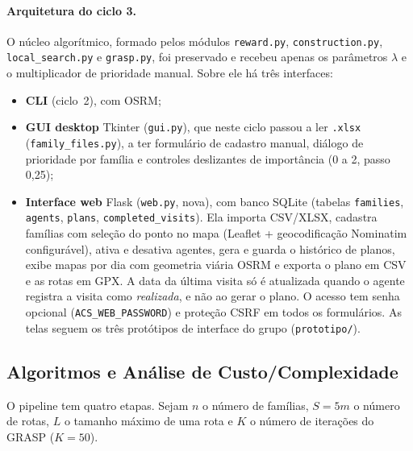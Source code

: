 \documentclass[11pt,a4paper]{article}
\begin{document}
\paragraph{Arquitetura do ciclo 3.} O núcleo algorítmico, formado pelos módulos \texttt{reward.py}, \texttt{construction.py}, \texttt{local\_search.py} e \texttt{grasp.py}, foi preservado e recebeu apenas os parâmetros $\lambda$ e o multiplicador de prioridade manual. Sobre ele há três interfaces:
\begin{itemize}
    \item \textbf{CLI} (ciclo~2), com OSRM;
    \item \textbf{GUI desktop} Tkinter (\texttt{gui.py}), que neste ciclo passou a ler \texttt{.xlsx} (\texttt{family\_files.py}), a ter formulário de cadastro manual, diálogo de prioridade por família e controles deslizantes de importância (0 a 2, passo 0,25);
    \item \textbf{Interface web} Flask (\texttt{web.py}, nova), com banco SQLite (tabelas \texttt{families}, \texttt{agents}, \texttt{plans}, \texttt{completed\_visits}). Ela importa CSV/XLSX, cadastra famílias com seleção do ponto no mapa (Leaflet + geocodificação Nominatim configurável), ativa e desativa agentes, gera e guarda o histórico de planos, exibe mapas por dia com geometria viária OSRM e exporta o plano em CSV e as rotas em GPX. A data da última visita só é atualizada quando o agente registra a visita como \emph{realizada}, e não ao gerar o plano. O acesso tem senha opcional (\texttt{ACS\_WEB\_PASSWORD}) e proteção CSRF em todos os formulários. As telas seguem os três protótipos de interface do grupo (\texttt{prototipo/}).
\end{itemize}

\subsection{Algoritmos e Análise de Custo/Complexidade}

O pipeline tem quatro etapas. Sejam $n$ o número de famílias, $S = 5m$ o número de rotas, $L$ o tamanho máximo de uma rota e $K$ o número de iterações do GRASP ($K = 50$).
\end{document}
